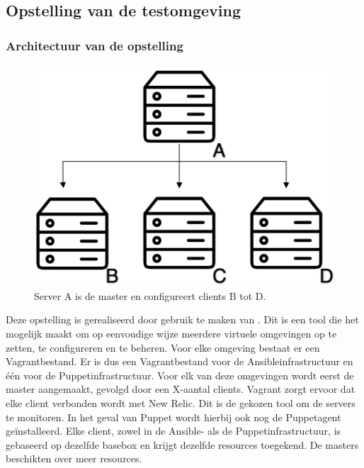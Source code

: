 \subsection{Opstelling van de testomgeving}
\label{sec:opstellingtestevn}
\subsubsection{Architectuur van de opstelling}


\begin{figure}
	\includegraphics[width=0.9\linewidth]{img/infrastructruur.png} 
	\caption{Server A is de master en configureert clients B tot D.}
	\label{fig:infrastructuur}
\end{figure}


Deze opstelling is gerealiseerd door gebruik te maken van \textcite{whatisvagrant}. Dit is een tool die het mogelijk maakt om op eenvoudige wijze meerdere virtuele omgevingen op te zetten, te configureren en te beheren.  Voor elke omgeving bestaat er een Vagrantbestand. Er is dus een Vagrantbestand voor de Ansibleinfrastructuur en \'e\'en voor de Puppetinfrastructuur. Voor elk van deze omgevingen wordt eerst de master aangemaakt, gevolgd door een X-aantal clients. Vagrant zorgt ervoor dat elke client  verbonden wordt met New Relic. Dit is de gekozen tool om de servers te monitoren. In het geval van Puppet wordt hierbij ook nog de Puppetagent ge\"installeerd. Elke client, zowel in de Ansible- als de Puppetinfrastructuur, is gebaseerd op dezelfde basebox en krijgt dezelfde resources toegekend. De masters beschikten over meer resources.

